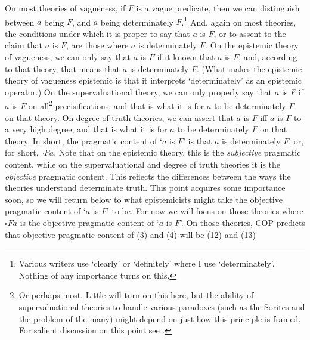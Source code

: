 On most theories of vagueness, if \(F\) is a vague predicate, then we can distinguish between \(a\) being \(F\), and \(a\) being determinately \(F\).\footnote{Various writers use `clearly' or `definitely' where I use `determinately'. Nothing of any importance turns on this.} And, again on most theories, the conditions under which it is proper to say that \(a\) is \(F\), or to assent to the claim that \(a\) is \(F\), are those where \(a\) is determinately \(F\). On the epistemic theory of vagueness, we can only say that \(a\) is \(F\) if it known that \(a\) is \(F\), and, according to that theory, that means that \(a\) is determinately \(F\). (What makes the epistemic theory of vagueness epistemic is that it interprets `determinately' as an epistemic operator.) On the supervaluational theory, we can only properly say that \(a\) is\textit{ F} if \(a\) is \(F\) on all\footnote{Or perhaps most. Little will turn on this here, but the ability of supervaluational theories to handle various paradoxes (such as the Sorites and the problem of the many) might depend on just how this principle is framed. For salient discussion on this point see \citet{Lewis1993c}.} precisifications, and that is what it is for \(a\) to be determinately \(F\) on that theory. On degree of truth theories, we can assert that \(a\) is \(F\) iff \(a\) is \(F\) to a very high degree, and that is what it is for \(a\) to be determinately \(F\) on that theory. In short, the pragmatic content of `\(a\) is \(F\)' is that \(a\) is determinately \(F\), or, for short, \(\square Fa\). Note that on the epistemic theory, this is the \textit{subjective} pragmatic content, while on the supervaluational and degree of truth theories it is the \textit{objective} pragmatic content. This reflects the differences between the ways the theories understand determinate truth. This point acquires some importance soon, so we will return below to what epistemicists might take the objective pragmatic content of `\(a\) is \(F\)' to be. For now we will focus on those theories where \(\square Fa\) is the objective pragmatic content of `\(a\) is \(F\)'. On those theories, COP predicts that objective pragmatic content of (3) and (4) will be (12) and (13)


